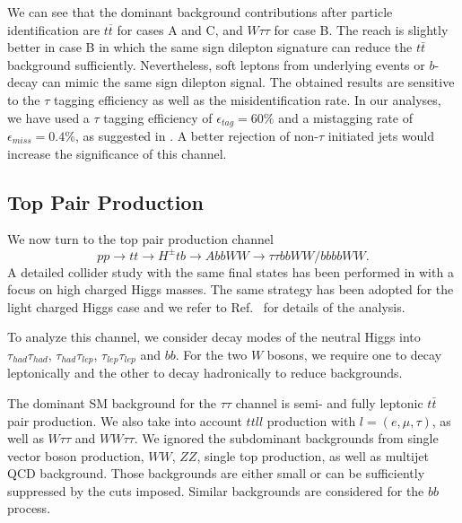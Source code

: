 We can see that the dominant background contributions after particle identification are $t\overline{t}$ for cases A and C, and $W\tau\tau$ for case B. The reach is slightly better in case B in which the same sign dilepton signature can reduce the $t\bar{t}$ background sufficiently. Nevertheless, soft leptons from underlying events or $b$-decay can mimic the same sign dilepton signal. The obtained results are sensitive to the $\tau$ tagging efficiency as well as the misidentification rate. In our analyses, we have used a $\tau$ tagging efficiency of $\epsilon_{tag}=60\%$ and a mistagging rate of $\epsilon_{miss}=0.4\%$, as suggested in \cite{Anderson:2013kxz}. A better rejection of non-$\tau$ initiated jets would increase the significance of this channel. 

\subsection{Top Pair Production}
 \label{sec:light_charged_analysis_tt}

We now turn to the top pair production channel 
\begin{equation}
pp \rightarrow tt \rightarrow H^{\pm} tb \rightarrow AbbWW\rightarrow \tau\tau bbWW/bbbbWW.
\end{equation} 
A detailed collider study with the same final states has been performed in \cite{Coleppa:2014cca} with a focus on high charged Higgs masses. The same strategy has been adopted for the light charged Higgs case and we refer to Ref.~\cite{Coleppa:2014cca} for details of the analysis. 

To analyze this channel, we consider decay modes of the neutral Higgs into $\tau_{had}\tau_{had}$, $\tau_{had}\tau_{lep}$, $\tau_{lep}\tau_{lep}$ and $bb$. For the two $W$ bosons, we require one to decay leptonically and the other to decay hadronically to reduce backgrounds.
 
 The dominant SM background for the $\tau\tau$ channel is semi- and fully leptonic $t\bar{t}$ pair production. We also take into account $ttll$ production with $l = (e, \mu, \tau)$, as well as $W\tau\tau$ and $WW\tau\tau$. We ignored the subdominant backgrounds from single vector boson production, $WW$, $ZZ$, single top production, as well as multijet QCD background. Those backgrounds are either small or can be sufficiently suppressed by the cuts imposed. Similar backgrounds are considered for the $bb$ process. 

